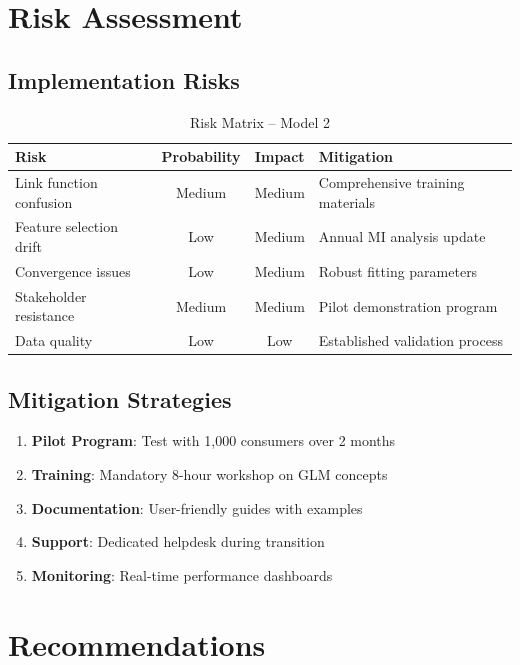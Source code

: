 \section{Risk Assessment}

\subsection{Implementation Risks}

\begin{table}[h]
\centering
\caption{Risk Matrix -- Model 2}
\begin{tabular}{p{3.5cm}ccp{5cm}}
\toprule
\textbf{Risk} & \textbf{Probability} & \textbf{Impact} & \textbf{Mitigation} \\
\midrule
Link function confusion & Medium & Medium & Comprehensive training materials \\
Feature selection drift & Low & Medium & Annual MI analysis update \\
Convergence issues & Low & Medium & Robust fitting parameters \\
Stakeholder resistance & Medium & Medium & Pilot demonstration program \\
Data quality & Low & Low & Established validation process \\
\bottomrule
\end{tabular}
\end{table}

\subsection{Mitigation Strategies}

\begin{enumerate}
    \item \textbf{Pilot Program}: Test with 1,000 consumers over 2 months
    \item \textbf{Training}: Mandatory 8-hour workshop on GLM concepts
    \item \textbf{Documentation}: User-friendly guides with examples
    \item \textbf{Support}: Dedicated helpdesk during transition
    \item \textbf{Monitoring}: Real-time performance dashboards
\end{enumerate}

\section{Recommendations}


